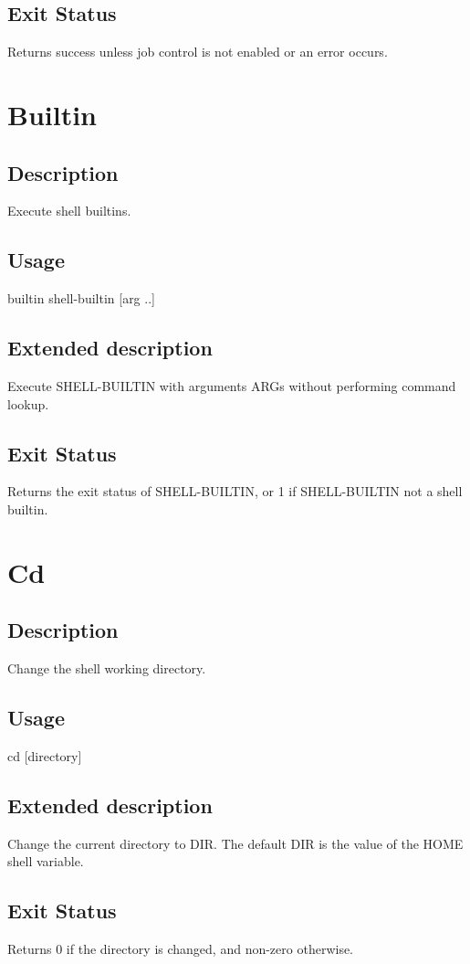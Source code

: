 \documentclass[12pt,a4paper]{report}
\begin{document}
\section{Exit Status}
Returns success unless job control is not enabled or an error occurs.
\newpage

\chapter{Builtin}
\section{Description}
Execute shell builtins.
\section{Usage}
builtin shell-builtin [arg ..]
\section{Extended description}
Execute SHELL-BUILTIN with arguments ARGs without performing command lookup.
\section{Exit Status}
Returns the exit status of SHELL-BUILTIN, or 1 if SHELL-BUILTIN not a shell builtin.
\newpage

\chapter{Cd}
\section{Description}
Change the shell working directory.
\section{Usage}
cd [directory]
\section{Extended description}
Change the current directory to DIR.  The default DIR is the value of the HOME shell variable.
\section{Exit Status}
Returns 0 if the directory is changed, and non-zero otherwise.
\newpage
\end{document}
